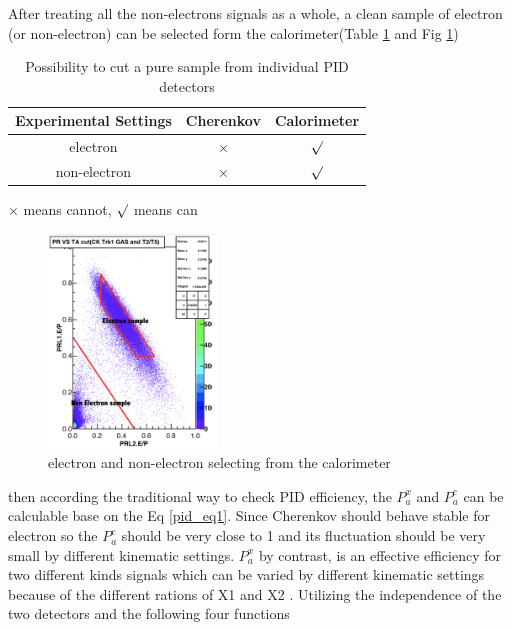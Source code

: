 After treating all the non-electrons signals as a whole, a clean sample of electron (or non-electron) can be selected form the calorimeter(Table \ref{sample2} and Fig \ref{sample3})
\begin{table}[!ht]
\large
\centering
 \caption{Possibility to cut a pure sample from individual PID detectors}\label{tab:tablenotes}
\begin{threeparttable}
\begin{tabular}[t]{|c|c|c|}\hline
  Experimental Settings & Cherenkov & Calorimeter  \\ \hline        
  electron          &   $\times$ & $\surd$ \\ \hline
  non-electron                &  $\times$  & $\surd$ \\  \hline
 \end{tabular}
\begin{tablenotes}
\centering
        \item[1]  $ \times $ means cannot, $ \surd $ means can
 \end{tablenotes}
\end{threeparttable}
\label{sample2}
 \end{table}
 
\begin{figure}
 	\begin{center}
 		\includegraphics[width=0.4\textwidth] {./pid_plot/PID3.png}
 		\caption{electron and non-electron selecting from the calorimeter } \label{sample3}
 	\end{center}
\end{figure}   
 
 
then according the traditional way to check PID efficiency, the $P_{a}^{x}$ and $P_{a}^{e}$ can be calculable base on the Eq \ref{pid_eq1}. Since Cherenkov should behave stable for electron so the $P_{a}^{e}$ should be very close to 1 and its fluctuation should be very small by different kinematic settings. $P_{a}^{x}$ by contrast, is an effective efficiency for two different kinds signals which can be varied by different kinematic settings because of the different rations of X1 and X2 . Utilizing the independence of the two detectors and the following four functions

